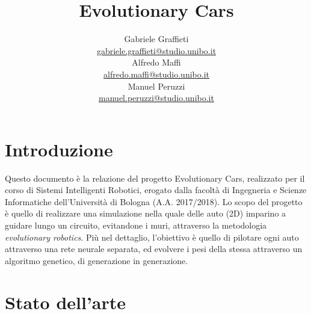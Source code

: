 \documentclass[a4paper,12pt]{article}
\title{\vspace{-5em}\Huge \textbf{Evolutionary Cars}
}
\author{
	Gabriele Graffieti \\ \small \url{gabriele.graffieti@studio.unibo.it}
	\vspace{15pt}
	\\
	Alfredo Maffi \\ \small \url{alfredo.maffi@studio.unibo.it}
	\vspace{15pt}
	\\
	Manuel Peruzzi \\ \small \url{manuel.peruzzi@studio.unibo.it}
}
\date{}
\begin{document}
\maketitle
{}
\tableofcontents
\newpage

\section{Introduzione}

Questo documento è la relazione del progetto Evolutionary Cars, realizzato per il corso di Sistemi Intelligenti Robotici, erogato dalla facoltà di Ingegneria e Scienze Informatiche dell'Università di Bologna (A.A. 2017/2018). Lo scopo del progetto è quello di realizzare una simulazione nella quale delle auto (2D) imparino a guidare lungo un circuito, evitandone i muri, attraverso la metodologia \emph{evolutionary robotics}. Più nel dettaglio, l'obiettivo è quello di pilotare ogni auto attraverso una rete neurale separata, ed evolvere i pesi della stessa attraverso un algoritmo genetico, di generazione in generazione.

\section{Stato dell'arte} \label{stato-dell-arte}
\end{document}
